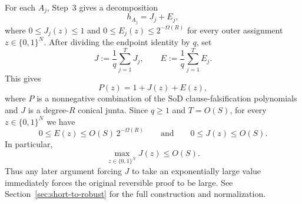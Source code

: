 \documentclass[11pt]{article}
\theoremstyle{definition}
\newcommand{\SoD}{\mathrm{SoD}}
\begin{document}
For each $A_j$, Step~3 gives a decomposition
\[
  h_{A_j}=J_j+E_j,
\]
where $0\le J_j(z)\le1$ and $0\le E_j(z)\le2^{-\Omega(R)}$ for every outer assignment
$z\in\{0,1\}^N$.  After dividing the endpoint identity by $q$, set
\[
  J:=\frac1q\sum_{j=1}^T J_j,
  \qquad
  E:=\frac1q\sum_{j=1}^T E_j.
\]
This gives
\[
  P(z)=1+J(z)+E(z),
\]
where $P$ is a nonnegative combination of the $\SoD$ clause-falsification polynomials
and $J$ is a degree-$R$ conical junta.  Since $q\ge1$ and $T=O(S)$, for every
$z\in\{0,1\}^N$ we have
\[
  0\le E(z)\le O(S)\,2^{-\Omega(R)}
  \qquad\text{and}\qquad
  0\le J(z)\le O(S).
\]
In particular,
\[
  \max_{z\in\{0,1\}^N}J(z)\le O(S).
\]
Thus any later argument forcing $J$ to take an exponentially large value immediately
forces the original reversible proof to be large.  See
Section~\ref{sec:short-to-robust} for the full construction and normalization.
\end{document}
